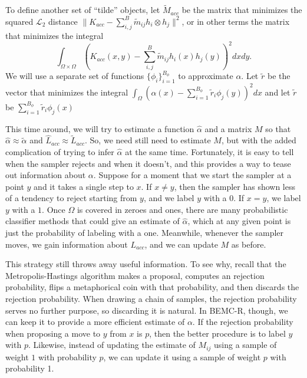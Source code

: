 \documentclass{article}
\newcommand\EMK[1]{\textcolor{purple}{EMK: #1}}
\begin{document}
To define another set of ``tilde'' objects, let  $\tilde{M}_{acc}$ be the matrix that minimizes the squared $\mathcal{L}_2$ distance $\|K_{acc} - \sum_{i,j}^B\tilde{m}_{ij} h_i \otimes h_j\|^2$, or in other terms the matrix that minimizes the integral $$\int_{\Omega\times\Omega}(K_{acc}(x,y) - \sum_{i,j}^B\tilde{m}_{ij} h_i(x)h_j(y))^2dx dy .$$ We will use a separate set of functions $\{\phi_i\}_{i=1}^{B_\phi}$ to approximate $\alpha$. Let $\tilde{r}$ be the vector that minimizes the integral $\int_{\Omega}(\alpha(x) -  \sum_{i=1}^{B_\phi}\tilde{r}_{i} \phi_j(y))^2dx  $ and let $\tilde{r}$ be $\sum_{i=1}^{B_\phi}\tilde{r}_{i} \phi_j(x)$

This time around, we will try to estimate a function $\hat{\alpha}$ and a matrix $M$ so that $\hat{\alpha}\approx \tilde{\alpha}$ and $\hat{L}_{acc} \approx \tilde{L}_{acc}$.%
So, we need still need to estimate $M$, but with the added complication of trying to infer $\hat{\alpha}$ at the same time. Fortunately, it is easy to tell when the sampler rejects and when it doesn't, and this provides a way to tease out information about $\alpha$. Suppose for a moment that we start the sampler at a point $y$ and it takes a single step to $x$. If $x\neq y$, then the sampler has shown less of a tendency to reject starting from $y$, and we label $y$ with a $0$. If $x = y$, we label $y$ with a $1$. Once $\Omega$ is covered in zeroes and ones, there are many probabilistic classifier methods that could give an estimate of $\hat{\alpha}$, which at any given point is just the probability of labeling with a one. Meanwhile, whenever the sampler moves, we gain information about $L_{acc}$, and we can update $M$ as before. 

This strategy still throws away useful information. To see why, recall that the Metropolis-Hastings algorithm makes a proposal, computes an rejection probability, flips a metaphorical coin with that probability, and then discards the rejection probability. When drawing a chain of samples, the rejection probability serves no further purpose, so discarding it is natural. In BEMC-R, though, we can keep it to provide a more efficient estimate of $\alpha$. If the rejection probability when proposing a move to $y$ from $x$ is $p$, then the better procedure is to label $y$ with $p$. Likewise, instead of updating the estimate of $M_{ij}$ using a sample of weight $1$ with probability $p$, we can update it using a sample of weight $p$ with probability 1.
\end{document}
